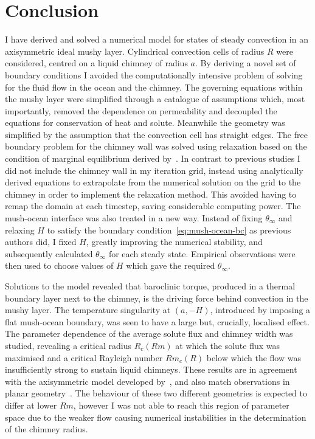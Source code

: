 \documentclass[11pt]{proc}
\begin{document}
\section{Conclusion}
\label{sec:conclusion}
I have derived and solved a numerical model for states of steady convection in an axisymmetric ideal mushy layer. Cylindrical convection cells of radius $R$ were considered, centred on a liquid chimney of radius $a$. By deriving a novel set of boundary conditions I avoided the computationally intensive problem of solving for the fluid flow in the ocean and the chimney. The governing equations within the mushy layer were simplified through a catalogue of assumptions which, most importantly, removed the dependence on permeability and decoupled the equations for conservation of heat and solute. Meanwhile the geometry was simplified by the assumption that the convection cell has straight edges. The free boundary problem for the chimney wall was solved using relaxation based on the condition of marginal equilibrium derived by~\citet*{schulze-worster-99}. In contrast to previous studies I did not include the chimney wall in my iteration grid, instead using analytically derived equations to extrapolate from the numerical solution on the grid to the chimney in order to implement the relaxation method. This avoided having to remap the domain at each timestep, saving considerable computing power. The mush-ocean interface was also treated in a new way. Instead of fixing $\theta_\infty$ and relaxing $H$ to satisfy the boundary condition~\eqref{eq:mush-ocean-bc} as previous authors did, I fixed $H$, greatly improving the numerical stability, and subsequently calculated $\theta_\infty$ for each steady state. Empirical observations were then used to choose values of $H$ which gave the required $\theta_\infty$.

Solutions to the model revealed that baroclinic torque, produced in a thermal boundary layer next to the chimney, is the driving force behind convection in the mushy layer. The temperature singularity at $(a,-H)$, introduced by imposing a flat mush-ocean boundary, was seen to have a large but, crucially, localised effect. The parameter dependence of the average solute flux and chimney width was studied, revealing a critical radius $R_c(Rm)$ at which the solute flux was maximised and a critical Rayleigh number $Rm_c(R)$ below which the flow was insufficiently strong to sustain liquid chimneys. These results are in agreement with the axisymmetric model developed by~\citet*{rees-jones-worster-13}, and also match observations in planar geometry~\citet*{wells-et-al-13}. The behaviour of these two different geometries is expected to differ at lower $Rm$, however I was not able to reach this region of parameter space due to the weaker flow causing numerical instabilities in the determination of the chimney radius.
\end{document}
